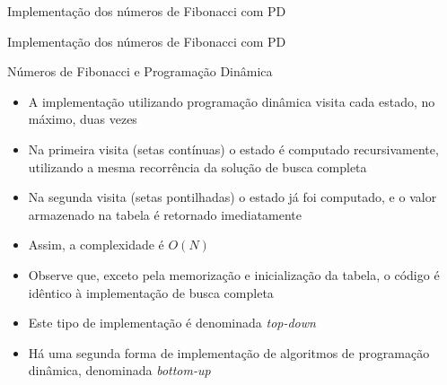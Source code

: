 \begin{frame}[fragile]{Implementação dos números de Fibonacci com PD}
\end{frame}

\begin{frame}[fragile]{Implementação dos números de Fibonacci com PD}
\end{frame}



\begin{frame}[fragile]{Números de Fibonacci e Programação Dinâmica}

    \begin{itemize}
        \item A implementação utilizando programação dinâmica visita cada estado, no máximo,
            duas vezes

        \item Na primeira visita (setas contínuas) o estado é computado recursivamente, utilizando
            a mesma recorrência da solução de busca completa

        \item Na segunda visita (setas pontilhadas) o estado já foi computado, e o valor armazenado
            na tabela é retornado imediatamente

        \item Assim, a complexidade é $O(N)$

        \item Observe que, exceto pela memorização e inicialização da tabela, o código é idêntico
            à implementação de busca completa

        \item Este tipo de implementação é denominada \textit{top-down}

        \item Há uma segunda forma de implementação de algoritmos de programação dinâmica,
            denominada \textit{bottom-up}
    \end{itemize}

\end{frame}
